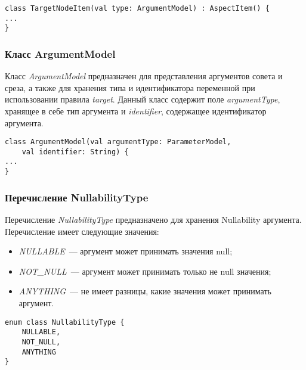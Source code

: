 \begin{lstlisting}[style={java}, label={lst:TargetNodeItem},
  caption={Класс TargetNodeItem}]
class TargetNodeItem(val type: ArgumentModel) : AspectItem() {
...
}
\end{lstlisting}
\subsubsection{Класс ArgumentModel}
\label{ssub:ArgumentModel}
Класс \textit{ArgumentModel} предназначен для представления аргументов совета и
среза, а также для хранения типа и идентификатора переменной при использовании
правила \textit{target}.
Данный класс содержит поле \textit{argumentType}, хранящее в себе тип аргумента
и \textit{identifier}, содержащее идентификатор аргумента.

\begin{lstlisting}[style={java}, label={lst:ArgumentModel},
  caption={Класс ArgumentModel}]
class ArgumentModel(val argumentType: ParameterModel,
	val identifier: String) {
...
}
\end{lstlisting}
\subsubsection{Перечисление NullabilityType}
\label{ssub:NullabilityType}
Перечисление \textit{NullabilityType} предназначено для хранения Nullability 
аргумента.
Перечисление имеет следующие значения:
\begin{itemize}
	\item \textit{NULLABLE}~--- аргумент может принимать значения null;
	\item \textit{NOT\_NULL}~--- аргумент может принимать только не null
		  значения;
	\item \textit{ANYTHING}~--- не имеет разницы, какие значения может
		  принимать аргумент.
\end{itemize}

\begin{lstlisting}[style={java}, label={lst:NullabilityType},
  caption={Перечисление NullabilityType}]
enum class NullabilityType {
    NULLABLE,
    NOT_NULL,
    ANYTHING
}
\end{lstlisting}
